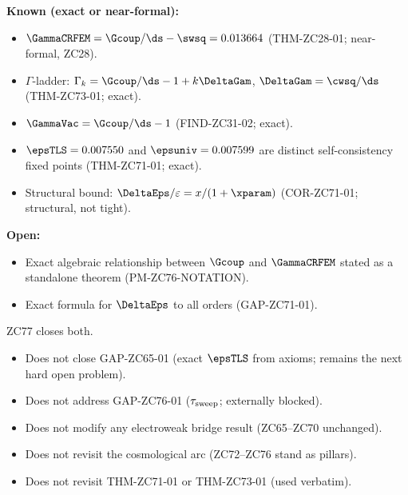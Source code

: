 \documentclass[12pt, a4paper]{article}
\begin{document}
\begin{keybox}[title={Pre-ZC77 Status}]
\textbf{Known (exact or near-formal):}
\begin{itemize}[leftmargin=2em, noitemsep]
  \item $\GammaCRFEM = \Gcoup/\ds - \swsq = 0.013664$
    (THM-ZC28-01; near-formal, ZC28).
  \item $\Gamma$-ladder: $\Gamma_k = \Gcoup/\ds - 1 + k\DeltaGam$,
    $\DeltaGam = \cwsq/\ds$ (THM-ZC73-01; exact).
  \item $\GammaVac = \Gcoup/\ds - 1$ (FIND-ZC31-02; exact).
  \item $\epsTLS = 0.007550$ and $\epsuniv = 0.007599$ are distinct
    self-consistency fixed points (THM-ZC71-01; exact).
  \item Structural bound: $\DeltaEps/\varepsilon = x/(1+\xparam)$
    (COR-ZC71-01; structural, not tight).
\end{itemize}

\textbf{Open:}
\begin{itemize}[leftmargin=2em, noitemsep]
  \item Exact algebraic relationship between $\Gcoup$ and $\GammaCRFEM$
    stated as a standalone theorem (PM-ZC76-NOTATION).
  \item Exact formula for $\DeltaEps$ to all orders (GAP-ZC71-01).
\end{itemize}

ZC77 closes both.
\end{keybox}

\begin{keybox}[title={What ZC77 Does NOT Do}]
\begin{itemize}[leftmargin=2em, noitemsep]
  \item Does not close GAP-ZC65-01 (exact $\epsTLS$ from axioms;
    remains the next hard open problem).
  \item Does not address GAP-ZC76-01 ($\tau_{\rm sweep}$; externally blocked).
  \item Does not modify any electroweak bridge result (ZC65--ZC70 unchanged).
  \item Does not revisit the cosmological arc (ZC72--ZC76 stand as pillars).
  \item Does not revisit THM-ZC71-01 or THM-ZC73-01 (used verbatim).
\end{itemize}
\end{keybox}
\end{document}
